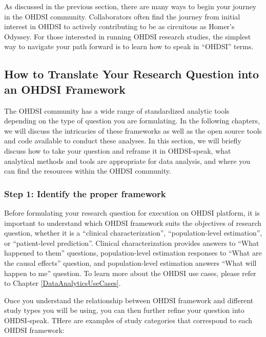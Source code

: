\documentclass[11pt]{book}
\theoremstyle{definition}
\theoremstyle{definition}
\theoremstyle{definition}
\theoremstyle{remark}
\begin{document}
As discussed in the previous section, there are many ways to begin your journey in the OHDSI community. Collaborators often find the journey from initial interest in OHDSI to actively contributing to be as circuitous as Homer's Odyssey. For those interested in running OHDSI research studies, the simplest way to navigate your path forward is to learn how to speak in ``OHDSI'' terms.

\hypertarget{how-to-translate-your-research-question-into-an-ohdsi-framework}{%
\subsection{How to Translate Your Research Question into an OHDSI Framework}\label{how-to-translate-your-research-question-into-an-ohdsi-framework}}

The OHDSI community has a wide range of standardized analytic tools depending on the type of question you are formulating. In the following chapters, we will discuss the intricacies of these frameworks as well as the open source tools and code available to conduct these analyses. In this section, we will briefly discuss how to take your question and reframe it in OHDSI-speak, what analytical methods and tools are appropriate for data analysis, and where you can find the resources within the OHDSI community.

\hypertarget{step-1-identify-the-proper-framework}{%
\subsubsection{Step 1: Identify the proper framework}\label{step-1-identify-the-proper-framework}}

Before formulating your research question for execution on OHDSI platform, it is important to understand which OHDSI framework suits the objectives of research question, whether it is a ``clinical characterization'', ``population-level estimation'', or ``patient-level prediction''. Clinical characterization provides answers to ``What happened to them'' questions, population-level estimation responses to ``What are the causal effects'' question, and population-level estimation answers ``What will happen to me'' question. To learn more about the OHDSI use cases, please refer to Chapter \ref{DataAnalyticsUseCases}.

Once you understand the relationship between OHDSI framework and different study types you will be using, you can then further refine your question into OHDSI-speak. THere are examples of study categories that correspond to each OHDSI framework:
\end{document}
